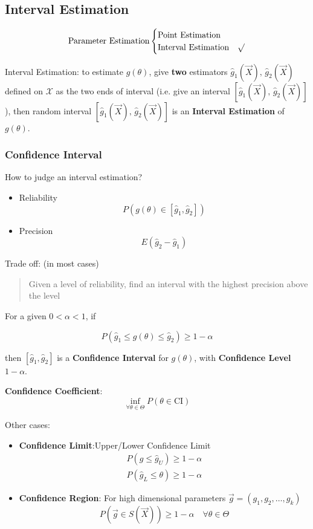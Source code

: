\subsection{Interval Estimation}\label{SectionIntervalEstimation}
\[
    \text{Parameter Estimation}\begin{cases}
        \text{Point Estimation}& \\
        \text{Interval Estimation}& \surd
    \end{cases}    
\]

    Interval Estimation: to estimate $g(\theta)$, give \textbf{two} estimators $\hat{g}_1(\vec{X}),\, \hat{g}_2(\vec{X})$ defined on $\mathscr{X}$ as the two ends of interval (i.e. give an interval $[\hat{g}_1(\vec{X}),\, \hat{g}_2(\vec{X})]$), then random interval $[\hat{g}_1(\vec{X}),\, \hat{g}_2(\vec{X})]$ is an \textbf{Interval Estimation} of $g(\theta)$.

    \subsubsection{Confidence Interval}\label{SubSectionConfidenceInterval}
    How to judge an interval estimation?
    \begin{itemize}
        \item Reliability
        \[P(g(\theta)\in[\hat{g}_1,\hat{g}_2])\]
        \item Precision
        \[E(\hat{g}_2-\hat{g}_1)\]
    \end{itemize}

    Trade off: (in most cases)
    \begin{quote}
        Given a level of reliability, find an interval with the highest precision above the level
    \end{quote}

\begin{point}
    For a given $0<\alpha<1$, if 
\end{point}

    \[
        P(\hat{g}_1\leq g(\theta)\leq \hat{g}_2)\geq 1-\alpha
    \]

    then $[\hat{g}_1,\hat{g}_2]$ is a \textbf{Confidence Interval} for $g(\theta)$, with \textbf{Confidence Level} $1-\alpha$. 
    
    \textbf{Confidence Coefficient}:
    \[\inf_{\forall\theta\in\Theta}P(
        \theta\in\mathrm{CI}
    )\]

    Other cases:
    \begin{itemize}[topsep=-4pt]
        \item \textbf{Confidence Limit}:Upper/Lower Confidence Limit
    \begin{align*}
        P(g\leq \hat{g}_U)\geq 1-\alpha\\
        P(\hat{g}_L\leq \theta)\geq 1-\alpha
    \end{align*}
        \item \textbf{Confidence Region}: For high dimensional parameters $\vec{g}=(g_1,g_2,\ldots,g_k)$
        \[P(\vec{g}\in S(\vec{X}))\geq 1-\alpha\quad \forall \theta\in\Theta \]
        
    \end{itemize}

